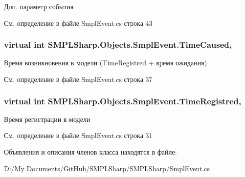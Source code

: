 Доп. параметр события 



См. определение в файле Smpl\-Event.\-cs строка 43

\hypertarget{class_s_m_p_l_sharp_1_1_objects_1_1_smpl_event_ad5ad0f4179e5d77831cc82d0a8bf5b29}{
\subsubsection[{Time\-Caused}]{\setlength{\rightskip}{0pt plus 5cm}virtual int S\-M\-P\-L\-Sharp.\-Objects.\-Smpl\-Event.\-Time\-Caused\hspace{0.3cm}{\ttfamily [get]}, {\ttfamily [set]}}}\label{de/d57/class_s_m_p_l_sharp_1_1_objects_1_1_smpl_event_ad5ad0f4179e5d77831cc82d0a8bf5b29}


Время возникновения в модели (Time\-Registred + время ожидания) 



См. определение в файле Smpl\-Event.\-cs строка 37

\hypertarget{class_s_m_p_l_sharp_1_1_objects_1_1_smpl_event_a5d72178bd46b26372514d711c05a3ea2}{
\subsubsection[{Time\-Registred}]{\setlength{\rightskip}{0pt plus 5cm}virtual int S\-M\-P\-L\-Sharp.\-Objects.\-Smpl\-Event.\-Time\-Registred\hspace{0.3cm}{\ttfamily [get]}, {\ttfamily [set]}}}\label{de/d57/class_s_m_p_l_sharp_1_1_objects_1_1_smpl_event_a5d72178bd46b26372514d711c05a3ea2}


Время регистрации в модели 



См. определение в файле Smpl\-Event.\-cs строка 31



Объявления и описания членов класса находятся в файле\-:\begin{DoxyCompactItemize}
\item 
D\-:/\-My Documents/\-Git\-Hub/\-S\-M\-P\-L\-Sharp/\-S\-M\-P\-L\-Sharp/Smpl\-Event.\-cs\end{DoxyCompactItemize}
